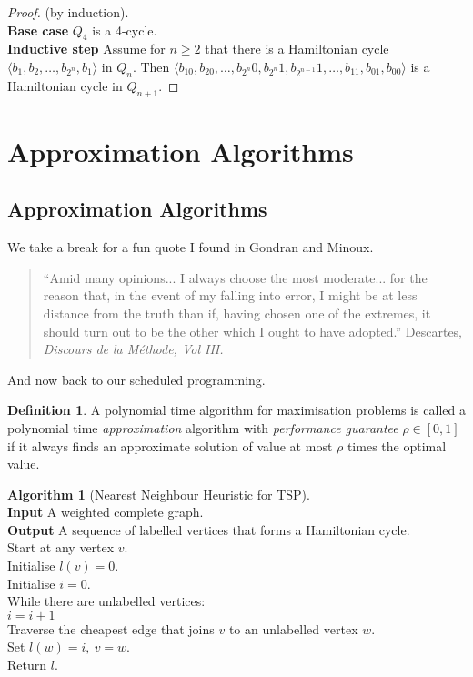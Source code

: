 \documentclass{article}
\theoremstyle{definition}
\newtheorem*{defn}{Definition}
\newtheorem*{alg}{Algorithm}
\begin{document}
\begin{proof}
(by induction). \\
\textbf{Base case} $Q_4$ is a 4-cycle. \\
\textbf{Inductive step} Assume for $n\ge 2$ that there is a Hamiltonian cycle $\langle b_1,b_2,\ldots,b_{2^n},b_1\rangle$ in $Q_n$.
Then $\langle b_10,b_20,\ldots,b_{2^n}0,b_{2^n}1,b_{2^{n-1}}1,\ldots,b_11,b_01,b_00\rangle$ is a Hamiltonian cycle in $Q_{n+1}$.
\end{proof}

\section{Approximation Algorithms}

\subsection{Approximation Algorithms}
We take a break for a fun quote I found in Gondran and Minoux.
\begin{quotation}
``Amid many opinions... I always choose the most moderate... for the reason that, in the event of my falling into error, I might be at less distance from the truth than if, having chosen one of the extremes, it should turn out to be the other which I ought to have adopted.'' Descartes, \emph{Discours de la M\'ethode, Vol III.}
\end{quotation}

And now back to our scheduled programming.

\begin{defn}
A polynomial time algorithm for maximisation problems is called a polynomial time \emph{approximation} algorithm with \emph{performance guarantee} $\rho\in [ 0,1 ]$ if it always finds an approximate solution of value at most $\rho$ times the optimal value.
\end{defn}

\begin{alg}[Nearest Neighbour Heuristic for TSP]~\\
\textbf{Input} A weighted complete graph. \\
\textbf{Output} A sequence of labelled vertices that forms a Hamiltonian cycle.\\
Start at any vertex $v$.\\
Initialise $l(v) = 0$.\\
Initialise $i=0$.\\
While there are unlabelled vertices: \\
\indent $i = i+1$ \\
\indent Traverse the cheapest edge that joins $v$ to an unlabelled vertex $w$. \\
\indent Set $l(w) = i,\ v=w$.\\
Return $l$.
\end{alg}
\end{document}
